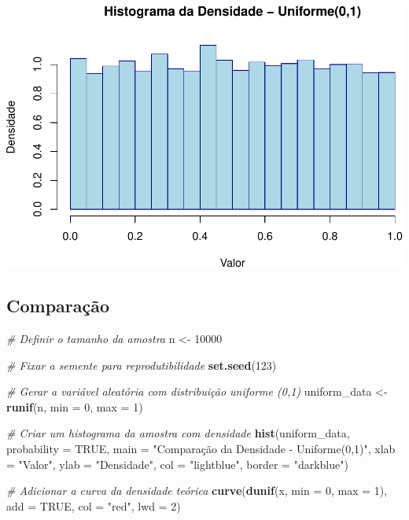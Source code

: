\documentclass[
]{book}
\newenvironment{Shaded}{\begin{snugshade}}{\end{snugshade}}
\newcommand{\AttributeTok}[1]{\textcolor[rgb]{0.13,0.29,0.53}{#1}}
\newcommand{\CommentTok}[1]{\textcolor[rgb]{0.56,0.35,0.01}{\textit{#1}}}
\newcommand{\ConstantTok}[1]{\textcolor[rgb]{0.56,0.35,0.01}{#1}}
\newcommand{\DecValTok}[1]{\textcolor[rgb]{0.00,0.00,0.81}{#1}}
\newcommand{\FunctionTok}[1]{\textcolor[rgb]{0.13,0.29,0.53}{\textbf{#1}}}
\newcommand{\NormalTok}[1]{#1}
\newcommand{\OtherTok}[1]{\textcolor[rgb]{0.56,0.35,0.01}{#1}}
\newcommand{\StringTok}[1]{\textcolor[rgb]{0.31,0.60,0.02}{#1}}
\theoremstyle{definition}
\theoremstyle{definition}
\theoremstyle{definition}
\theoremstyle{definition}
\theoremstyle{remark}
\begin{document}
\includegraphics{meuLivro2_files/figure-latex/unnamed-chunk-119-1.pdf}

\subsection{Comparação}\label{comparauxe7uxe3o-2}

\begin{Shaded}
\begin{Highlighting}[]
\CommentTok{\# Definir o tamanho da amostra}
\NormalTok{n }\OtherTok{\textless{}{-}} \DecValTok{10000}

\CommentTok{\# Fixar a semente para reprodutibilidade}
\FunctionTok{set.seed}\NormalTok{(}\DecValTok{123}\NormalTok{)}

\CommentTok{\# Gerar a variável aleatória com distribuição uniforme (0,1)}
\NormalTok{uniform\_data }\OtherTok{\textless{}{-}} \FunctionTok{runif}\NormalTok{(n, }\AttributeTok{min =} \DecValTok{0}\NormalTok{, }\AttributeTok{max =} \DecValTok{1}\NormalTok{)}

\CommentTok{\# Criar um histograma da amostra com densidade}
\FunctionTok{hist}\NormalTok{(uniform\_data, }\AttributeTok{probability =} \ConstantTok{TRUE}\NormalTok{, }
     \AttributeTok{main =} \StringTok{"Comparação da Densidade {-} Uniforme(0,1)"}\NormalTok{, }
     \AttributeTok{xlab =} \StringTok{"Valor"}\NormalTok{, }
     \AttributeTok{ylab =} \StringTok{"Densidade"}\NormalTok{, }
     \AttributeTok{col =} \StringTok{"lightblue"}\NormalTok{, }
     \AttributeTok{border =} \StringTok{"darkblue"}\NormalTok{)}

\CommentTok{\# Adicionar a curva da densidade teórica}
\FunctionTok{curve}\NormalTok{(}\FunctionTok{dunif}\NormalTok{(x, }\AttributeTok{min =} \DecValTok{0}\NormalTok{, }\AttributeTok{max =} \DecValTok{1}\NormalTok{), }
      \AttributeTok{add =} \ConstantTok{TRUE}\NormalTok{, }
      \AttributeTok{col =} \StringTok{"red"}\NormalTok{, }
      \AttributeTok{lwd =} \DecValTok{2}\NormalTok{)}
\end{Highlighting}
\end{Shaded}
\end{document}
